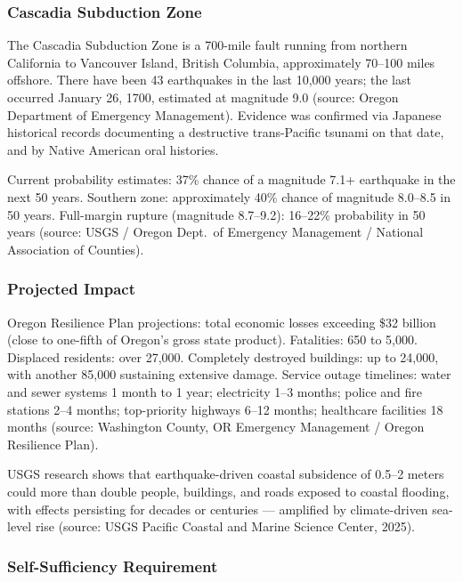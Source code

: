 \documentclass[11pt,letterpaper]{article}
\begin{document}
\subsubsection{Cascadia Subduction Zone}

The Cascadia Subduction Zone is a 700-mile fault running from northern California to Vancouver Island, British Columbia, approximately 70--100 miles offshore. There have been 43 earthquakes in the last 10,000 years; the last occurred January 26, 1700, estimated at magnitude 9.0 (source: Oregon Department of Emergency Management). Evidence was confirmed via Japanese historical records documenting a destructive trans-Pacific tsunami on that date, and by Native American oral histories.

Current probability estimates: 37\% chance of a magnitude 7.1+ earthquake in the next 50 years. Southern zone: approximately 40\% chance of magnitude 8.0--8.5 in 50 years. Full-margin rupture (magnitude 8.7--9.2): 16--22\% probability in 50 years (source: USGS / Oregon Dept.\ of Emergency Management / National Association of Counties).

\subsubsection{Projected Impact}

Oregon Resilience Plan projections: total economic losses exceeding \$32 billion (close to one-fifth of Oregon's gross state product). Fatalities: 650 to 5,000. Displaced residents: over 27,000. Completely destroyed buildings: up to 24,000, with another 85,000 sustaining extensive damage. Service outage timelines: water and sewer systems 1 month to 1 year; electricity 1--3 months; police and fire stations 2--4 months; top-priority highways 6--12 months; healthcare facilities 18 months (source: Washington County, OR Emergency Management / Oregon Resilience Plan).

USGS research shows that earthquake-driven coastal subsidence of 0.5--2 meters could more than double people, buildings, and roads exposed to coastal flooding, with effects persisting for decades or centuries --- amplified by climate-driven sea-level rise (source: USGS Pacific Coastal and Marine Science Center, 2025).

\subsubsection{Self-Sufficiency Requirement}
\end{document}

